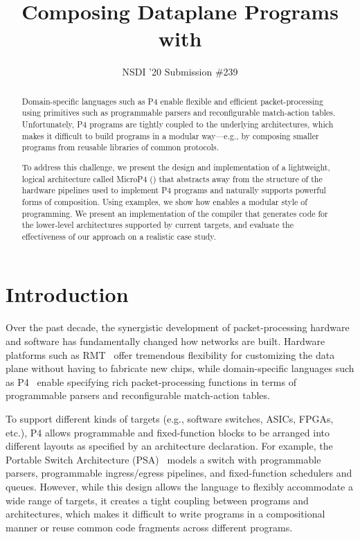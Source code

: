 \documentclass[letterpaper,twocolumn,10pt]{article}
\begin{document}
\date{}
\title{\Large \bf Composing Dataplane Programs with \ulang}
\author{{\rm NSDI '20 Submission \#239}}
\maketitle

\vspace*{-3em}

\begin{abstract}
Domain-specific languages such as P4 enable flexible and efficient
packet-processing using primitives such as programmable parsers and
reconfigurable match-action tables. Unfortunately, P4 programs are
tightly coupled to the underlying architectures, which makes it
difficult to build programs in a modular way---e.g., by composing
smaller programs from reusable libraries of common protocols.

To address this challenge, we present the design and implementation of
a lightweight, logical architecture called MicroP4 (\ulang) that
abstracts away from the structure of the hardware pipelines used to
implement P4 programs and naturally supports powerful forms of
composition. Using examples, we show how \ulang enables a modular
style of programming. We present an implementation of the \ucomp
compiler that generates code for the lower-level architectures
supported by current targets, and evaluate the effectiveness of our
approach on a realistic case study.
\end{abstract}

\section{Introduction}
\label{sec:intro}
Over the past decade, the synergistic development of packet-processing
hardware and software has fundamentally changed how networks are
built. Hardware platforms such as RMT~\cite{bosshart2013forwarding}
offer tremendous flexibility for customizing the data plane without
having to fabricate new chips, while domain-specific languages such as
P4~\cite{bosshart2014p4, p4lang} enable specifying rich
packet-processing functions in terms of programmable parsers and
reconfigurable match-action tables.

To support different kinds of targets (e.g., software switches, ASICs,
FPGAs, etc.), P4 allows programmable and fixed-function blocks to be
arranged into different layouts as specified by an architecture
declaration. For example, the Portable Switch Architecture
(PSA)~\cite{psa} models a switch with programmable parsers,
programmable ingress/egress pipelines, and fixed-function schedulers
and queues. However, while this design allows the language to flexibly
accommodate a wide range of targets, it creates a tight coupling
between programs and architectures, which makes it difficult to write
programs in a compositional manner or reuse common code fragments
across different programs.
\end{document}
